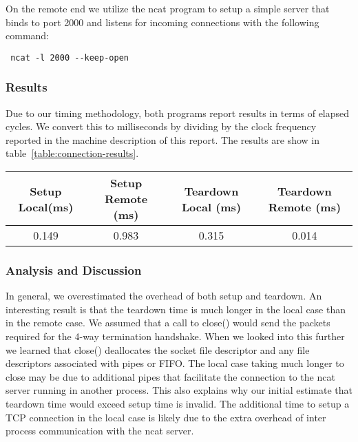  On the remote end we utilize the ncat program to setup a simple server that binds to port 2000 and listens for incoming connections with the following command:
 \begin{verbatim}
 ncat -l 2000 --keep-open
 \end{verbatim}
\subsubsection{Results}
Due to our timing methodology, both programs report results in terms of elapsed cycles. We convert this to milliseconds by dividing by the clock frequency reported in the machine description of this report.
The results are show in table~\ref{table:connection-results}.

\begin{table*}[b]
\begin{tabular}{|c|c|c|c|}
\hline
Setup Local(ms) & Setup Remote (ms) & Teardown Local (ms) & Teardown Remote (ms)\\ \hline
0.149            & 0.983          & 0.315            & 0.014         \\ \hline
\end{tabular}
\caption{Experimental results for TCP connection setup and teardown overhead}
\label{table:connection-results}
\end{table*}

\subsubsection{Analysis and Discussion}
In general, we overestimated the overhead of both setup and teardown. An interesting result is 
that the teardown time is much longer in the local case than in the remote case. We assumed that a 
call to close() would send the packets required for the 4-way termination handshake. When we looked 
into this further we learned that close() deallocates the socket file descriptor and any file 
descriptors associated with pipes or FIFO. The local case taking much longer to close may be due to 
additional pipes that facilitate the connection to the ncat server running in another process.
This also explains why our initial estimate that teardown time would exceed setup time is invalid.
The additional time to setup a TCP connection in the local case is likely due to the extra overhead 
of inter process communication with the ncat server.

